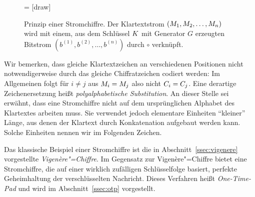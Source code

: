 \begin{figure}[h]
  \centering
  = [draw]
  \caption{Prinzip einer Stromchiffre. Der Klartextstrom
    $(M_1,M_2,\dots,M_n)$ wird mit einem, aus dem
    Schlüssel $K$ mit Generator $G$ erzeugten Bitstrom $(b^{(1)},
    b^{(2)}, \ldots, b^{(n)})$ durch $\circ$ verknüpft.} 
  \label{fig:streamcipher}
\end{figure}


Wir bemerken, dass gleiche Klartextzeichen an verschiedenen Positionen
nicht notwendigerweise durch das gleiche Chiffratzeichen codiert werden:
Im Allgemeinen folgt für $i \ne j$ aus $M_i = M_j$ also
nicht $C_i = C_j$. Eine derartige Zeichenersetzung heißt
\emph{polyalphabetische Substitution}. An dieser Stelle sei erwähnt,
dass eine Stromchiffre nicht auf dem ursprünglichen Alphabet des
Klartextes arbeiten muss. Sie verwendet jedoch elementare Einheiten
"`kleiner"' Länge, aus denen der Klartext durch Konkatenation aufgebaut
werden kann. Solche Einheiten nennen wir im Folgenden Zeichen. 


Das klassische Beispiel einer Stromchiffre ist die in
Abschnitt~\ref{ssec:vigenere} vorgestellte \emph{Vigenère"=Chiffre}. Im
Gegensatz zur Vigenère"=Chiffre bietet eine Stromchiffre, die auf einer
wirklich zufälligen Schlüsselfolge basiert, perfekte Geheimhaltung der
verschlüsselten Nachricht. Dieses Verfahren heißt \emph{One-Time-Pad}
\indexOTP und wird im Abschnitt~\ref{ssec:otp} vorgestellt. 


